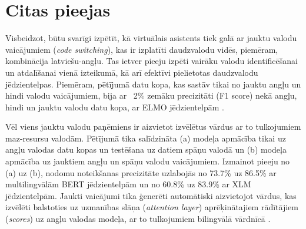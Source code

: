 \section{Citas pieejas}

Visbeidzot, būtu svarīgi izpētīt, kā virtuālais asistents tiek galā ar jauktu valodu vaicājumiem (\textit{code switching}), kas ir izplatīti daudzvalodu vidēs, piemēram, kombinācija latviešu-angļu. Tas ietver pieeju izpēti vairāku valodu identificēšanai un atdalīšanai vienā izteikumā, kā arī efektīvi pielietotas daudzvalodu jēdzientelpas. Piemēram, pētījumā datu kopa, kas sastāv tikai no jauktu angļu un hindi valodu vaicājumiem, bija ar ~2\% zemāku precizitāti (F1 score) nekā angļu, hindi un jauktu valodu datu kopa, ar ELMO jēdzientelpām \cite{jayarao2018}.

Vēl viens jauktu valodu paņēmiens ir aizvietot izvēlētus vārdus ar to tulkojumiem maz-resursu valodām. Pētījumā \cite{liu2020} tika salīdzināta (a) modeļa apmācība tikai uz angļu valodas datu kopas un testēšana uz datiem spāņu valodā un (b) modeļa apmācība uz jauktiem angļu un spāņu valodu vaicājumiem. Izmainot pieeju no (a) uz (b), nodomu noteikšanas precizitāte uzlabojās no 73.7\% uz 86.5\% ar multilingvālām BERT jēdzientelpām un no 60.8\% uz 83.9\% ar XLM jēdzientelpām. Jaukti vaicājumi tika ģenerēti automātiski aizvietojot vārdus, kas izvēlēti balstoties uz uzmanības slāņa (\textit{attention layer}) aprēķinātajiem rādītājiem (\textit{scores}) uz angļu valodas modeļa, ar to tulkojumiem bilingvālā vārdnīcā \cite{liu2020}.
